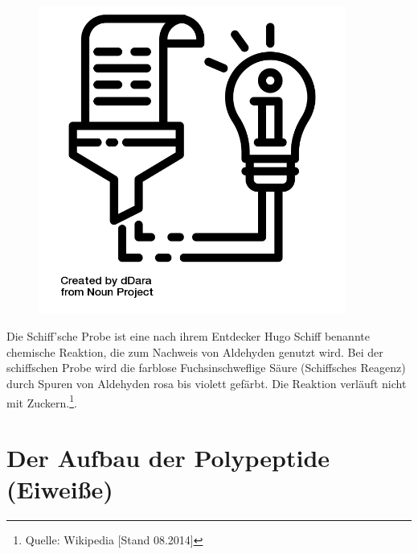 \documentclass{scrartcl}  %
\begin{document}
\vspace{0.3cm}
			\begin{tcolorbox}[enhanced,
				colback=white,
				colframe=darkgray,
				fonttitle=\sffamily\bfseries\large, 
				title=Die Schiff'sche Probe,  %
				attach boxed title to top left={xshift=3.2mm,yshift=-0.50mm},
				boxed title style={skin=enhancedfirst jigsaw,size=small,arc=1mm,bottom=-1mm,colframe=darkgray,height=0.75cm},
				colbacktitle=darkgray,
				drop lifted shadow]
				\begin{figure}  
					\centering
					\vspace{-14pt}  %
					\includegraphics[width=0.9\textwidth]{symbols/symbol_tex_content}
				\end{figure}
				
				Die Schiff'sche Probe ist eine nach ihrem Entdecker Hugo Schiff benannte chemische Reaktion, die zum Nachweis von Aldehyden genutzt wird. Bei der schiffschen Probe wird die farblose Fuchsinschweflige Säure (Schiffsches Reagenz) durch Spuren von Aldehyden rosa bis violett gefärbt. \newline
				Die Reaktion verläuft nicht mit Zuckern.\footnote{Quelle: Wikipedia [Stand 08.2014]}. 
				\vspace{0.1cm}		
			\end{tcolorbox}	

\newpage
	\part{Der Aufbau der Polypeptide (Eiweiße)}
\end{document}
